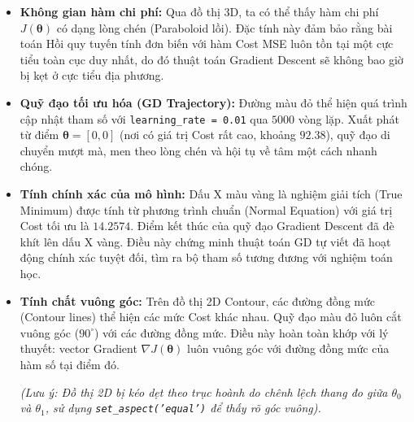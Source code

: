 \begin{itemize}
    \item \textbf{Không gian hàm chi phí:} Qua đồ thị 3D, ta có thể thấy hàm chi phí \(J(\boldsymbol{\theta})\) có dạng lòng chén (Paraboloid lồi). Đặc tính này đảm bảo rằng bài toán Hồi quy tuyến tính đơn biến với hàm Cost MSE luôn tồn tại một cực tiểu toàn cục duy nhất, do đó thuật toán Gradient Descent sẽ không bao giờ bị kẹt ở cực tiểu địa phương.
    
    \item \textbf{Quỹ đạo tối ưu hóa (GD Trajectory):} Đường màu đỏ thể hiện quá trình cập nhật tham số với \texttt{learning\_rate = 0.01} qua \(5000\) vòng lặp. Xuất phát từ điểm \(\boldsymbol{\theta} = [0,0]\) (nơi có giá trị Cost rất cao, khoảng \(92.38\)), quỹ đạo di chuyển mượt mà, men theo lòng chén và hội tụ về tâm một cách nhanh chóng.
    
    \item \textbf{Tính chính xác của mô hình:} Dấu X màu vàng là nghiệm giải tích (True Minimum) được tính từ phương trình chuẩn (Normal Equation) với giá trị Cost tối ưu là \(14.2574\). Điểm kết thúc của quỹ đạo Gradient Descent đã đè khít lên dấu X vàng. Điều này chứng minh thuật toán GD tự viết đã hoạt động chính xác tuyệt đối, tìm ra bộ tham số tương đương với nghiệm toán học.
    
    \item \textbf{Tính chất vuông góc:} Trên đồ thị 2D Contour, các đường đồng mức (Contour lines) thể hiện các mức Cost khác nhau. Quỹ đạo màu đỏ luôn cắt vuông góc (\(90^\circ\)) với các đường đồng mức. Điều này hoàn toàn khớp với lý thuyết: vector Gradient \(\nabla J(\boldsymbol{\theta})\) luôn vuông góc với đường đồng mức của hàm số tại điểm đó. 
    
    \textit{(Lưu ý: Đồ thị 2D bị kéo dẹt theo trục hoành do chênh lệch thang đo giữa \(\theta_0\) và \(\theta_1\), sử dụng \texttt{set\_aspect('equal')} để thấy rõ góc vuông).}
\end{itemize}